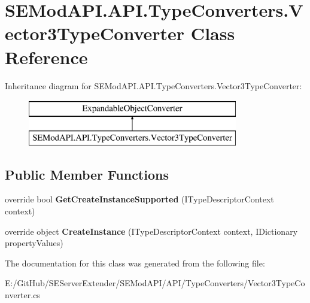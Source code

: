 \hypertarget{class_s_e_mod_a_p_i_1_1_a_p_i_1_1_type_converters_1_1_vector3_type_converter}{}\section{S\+E\+Mod\+A\+P\+I.\+A\+P\+I.\+Type\+Converters.\+Vector3\+Type\+Converter Class Reference}
\label{class_s_e_mod_a_p_i_1_1_a_p_i_1_1_type_converters_1_1_vector3_type_converter}
Inheritance diagram for S\+E\+Mod\+A\+P\+I.\+A\+P\+I.\+Type\+Converters.\+Vector3\+Type\+Converter\+:\begin{figure}[H]
\begin{center}
\leavevmode
\includegraphics[height=2.000000cm]{class_s_e_mod_a_p_i_1_1_a_p_i_1_1_type_converters_1_1_vector3_type_converter}
\end{center}
\end{figure}
\subsection*{Public Member Functions}
\begin{DoxyCompactItemize}
\item 
\hypertarget{class_s_e_mod_a_p_i_1_1_a_p_i_1_1_type_converters_1_1_vector3_type_converter_ad0effc7e5ee1876c151bd8360f3aada5}{}override bool {\bfseries Get\+Create\+Instance\+Supported} (I\+Type\+Descriptor\+Context context)\label{class_s_e_mod_a_p_i_1_1_a_p_i_1_1_type_converters_1_1_vector3_type_converter_ad0effc7e5ee1876c151bd8360f3aada5}

\item 
\hypertarget{class_s_e_mod_a_p_i_1_1_a_p_i_1_1_type_converters_1_1_vector3_type_converter_aa09f59d056536d9a5f39d9d8fef279a6}{}override object {\bfseries Create\+Instance} (I\+Type\+Descriptor\+Context context, I\+Dictionary property\+Values)\label{class_s_e_mod_a_p_i_1_1_a_p_i_1_1_type_converters_1_1_vector3_type_converter_aa09f59d056536d9a5f39d9d8fef279a6}

\end{DoxyCompactItemize}


The documentation for this class was generated from the following file\+:\begin{DoxyCompactItemize}
\item 
E\+:/\+Git\+Hub/\+S\+E\+Server\+Extender/\+S\+E\+Mod\+A\+P\+I/\+A\+P\+I/\+Type\+Converters/Vector3\+Type\+Converter.\+cs\end{DoxyCompactItemize}
